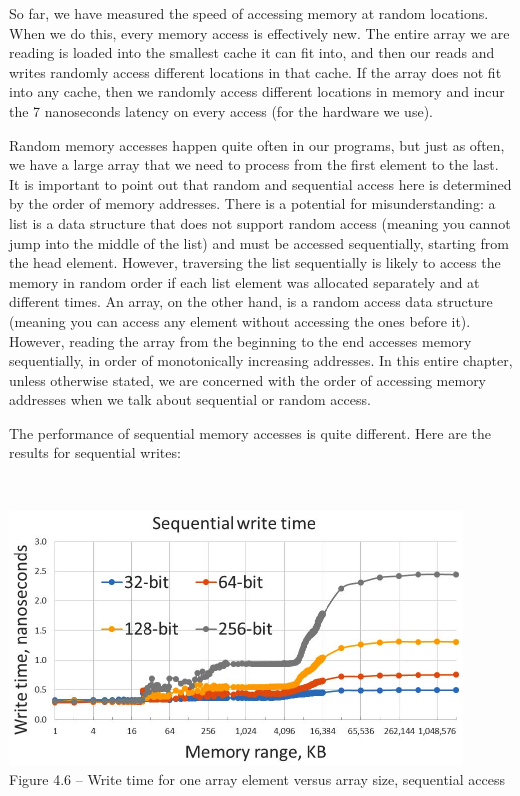 So far, we have measured the speed of accessing memory at random locations. When we do this, every memory access is effectively new. The entire array we are reading is loaded into the smallest cache it can fit into, and then our reads and writes randomly access different locations in that cache. If the array does not fit into any cache, then we randomly access different locations in memory and incur the 7 nanoseconds latency on every access (for the hardware we use).

Random memory accesses happen quite often in our programs, but just as often, we have a large array that we need to process from the first element to the last. It is important to point out that random and sequential access here is determined by the order of memory addresses. There is a potential for misunderstanding: a list is a data structure that does not support random access (meaning you cannot jump into the middle of the list) and must be accessed sequentially, starting from the head element. However, traversing the list sequentially is likely to access the memory in random order if each list element was allocated separately and at different times. An array, on the other hand, is a random access data structure (meaning you can access any element without accessing the ones before it). However, reading the array from the beginning to the end accesses memory sequentially, in order of monotonically increasing addresses. In this entire chapter, unless otherwise stated, we are concerned with the order of accessing memory addresses when we talk about sequential or random access.

The performance of sequential memory accesses is quite different. Here are the results for sequential writes:

\hspace*{\fill} \\ %
\begin{center}
\includegraphics[width=0.9\textwidth]{content/1/chapter4/images/6.jpg}\\
Figure 4.6 – Write time for one array element versus array size, sequential access
\end{center}

